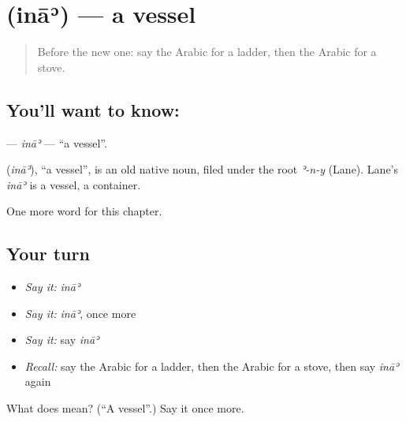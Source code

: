 \section[\texorpdfstring{\ar{إناء} (ināʾ)}{إناء (ināʾ)}]{ (ināʾ) — a vessel}

\label{lesson:AR-C123-ina}



\begin{quote}
Before the new one: say the Arabic for a ladder, then the Arabic for a stove.
\end{quote}

\subsection*{You'll want to know: }
\textbf{} — \emph{ināʾ} — \textquotedblleft{}a vessel\textquotedblright{}.

\begin{cousinweb}
\textbf{} (\emph{ināʾ}), \textquotedblleft{}a vessel\textquotedblright{}, is an old native noun, filed under the root \emph{ʾ-n-y} (Lane). Lane's \emph{ināʾ} is a vessel, a container.
\end{cousinweb}

\begin{grammarlens}[title={What you've built}]
One more word for this chapter.
\end{grammarlens}

\subsection*{Your turn}
\begin{itemize}
\raggedright
  \item \emph{Say it:} \emph{ināʾ}
  \item \emph{Say it:} \emph{ināʾ}, once more
  \item \emph{Say it:} say \emph{ināʾ}
  \item \emph{Recall:} say the Arabic for a ladder, then the Arabic for a stove, then say \emph{ināʾ} again
\end{itemize}

\begin{tcolorbox}[breakable,colback=teal!4,colframe=teal!35!black,title={Before you move on}]
What does  mean? (\textquotedblleft{}A vessel\textquotedblright{}.) Say it once more.
\end{tcolorbox}
